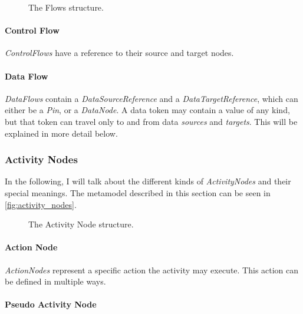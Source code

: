 \begin{figure}[!ht]
	\centering
	
	\caption{The Flows structure.}
	\label{fig:flows}
\end{figure}

\paragraph{Control Flow}

\emph{ControlFlows} have a reference to their source and target nodes.

\paragraph{Data Flow}

\emph{DataFlows} contain a \emph{DataSourceReference} and a \emph{DataTargetReference}, which can either be a \emph{Pin}, or a \emph{DataNode}. A data token may contain a value of any kind, but that token can travel only to and from data \emph{sources} and \emph{targets}. This will be explained in more detail below.

\subsubsection*{Activity Nodes}

In the following, I will talk about the different kinds of \emph{ActivityNodes} and their special meanings. The metamodel described in this section can be seen in \autoref{fig:activity_nodes}.

\begin{figure}[!ht]
	\centering
	
	\caption{The Activity Node structure.}
	\label{fig:activity_nodes}
\end{figure}

\paragraph{Action Node}

\emph{ActionNodes} represent a specific action the activity may execute. This action can be defined in multiple ways.

\paragraph{Pseudo Activity Node}

